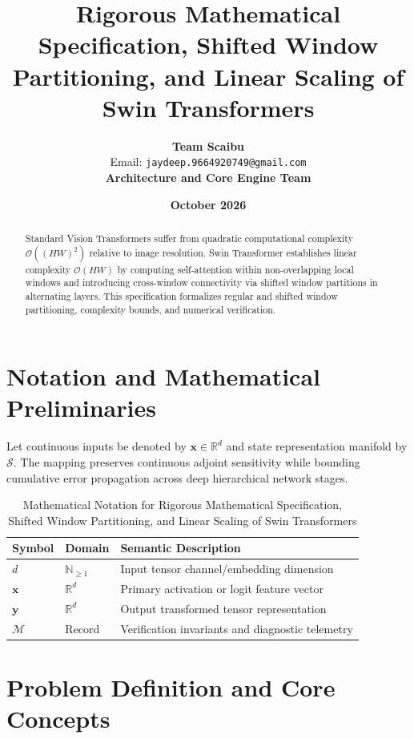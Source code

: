 \documentclass[11pt,a4paper]{article}
\title{\textbf{Rigorous Mathematical Specification, Shifted Window Partitioning, and Linear Scaling of Swin Transformers}}
\author{\textbf{Team Scaibu} \\ \small Email: \texttt{jaydeep.9664920749@gmail.com} \\ \small \textbf{Architecture and Core Engine Team}}
\date{\textbf{October 2026}}
\theoremstyle{definition}
\begin{document}
\maketitle

\begin{abstract}
Standard Vision Transformers suffer from quadratic computational complexity $\mathcal{O}((HW)^2)$ relative to image resolution. Swin Transformer establishes linear complexity $\mathcal{O}(HW)$ by computing self-attention within non-overlapping local windows and introducing cross-window connectivity via shifted window partitions in alternating layers. This specification formalizes regular and shifted window partitioning, complexity bounds, and numerical verification.
\end{abstract}

\section{Notation and Mathematical Preliminaries}

Let continuous inputs be denoted by $\mathbf{x} \in \mathbb{R}^d$ and state representation manifold by $\mathcal{S}$. The mapping preserves continuous adjoint sensitivity while bounding cumulative error propagation across deep hierarchical network stages.

\begin{table}[h]
\centering
\caption{Mathematical Notation for Rigorous Mathematical Specification, Shifted Window Partitioning, and Linear Scaling of Swin Transformers}
\begin{tabular}{lll}
\toprule
\textbf{Symbol} & \textbf{Domain} & \textbf{Semantic Description} \\
\midrule
$d$ & $\mathbb{N}_{\ge 1}$ & Input tensor channel/embedding dimension \\
$\mathbf{x}$ & $\mathbb{R}^d$ & Primary activation or logit feature vector \\
$\mathbf{y}$ & $\mathbb{R}^d$ & Output transformed tensor representation \\
$\mathcal{M}$ & Record & Verification invariants and diagnostic telemetry \\
\bottomrule
\end{tabular}
\end{table}

\section{Problem Definition and Core Concepts}
\end{document}
